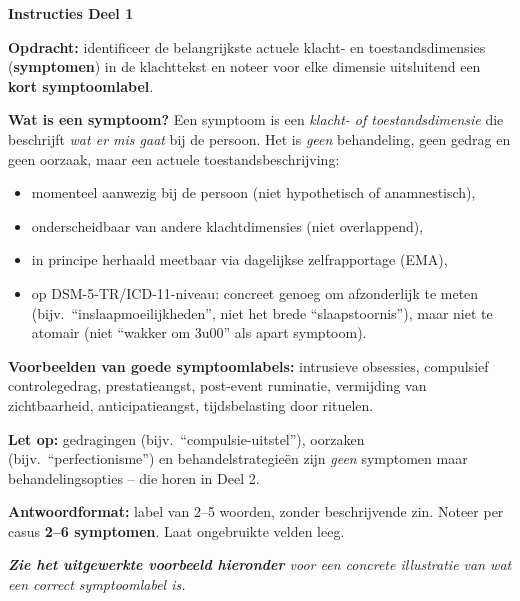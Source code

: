 \documentclass[11pt,a4paper]{article}
\begin{document}
\begin{tcolorbox}[colback=blue!3,colframe=PrimaryBlue,arc=2.5mm,boxrule=0.9pt,
  left=10pt,right=10pt,top=9pt,bottom=9pt]
\textbf{\color{PrimaryBlue}Instructies Deel 1}

\smallskip\small
\textbf{Opdracht:} identificeer de belangrijkste actuele klacht- en toestandsdimensies
(\textbf{symptomen}) in de klachttekst en noteer voor elke dimensie uitsluitend een
\textbf{kort symptoomlabel}.

\textbf{Wat is een symptoom?}
Een symptoom is een \emph{klacht- of toestandsdimensie} die beschrijft \emph{wat er
mis gaat} bij de persoon. Het is \emph{geen} behandeling, geen gedrag en geen oorzaak,
maar een actuele toestandsbeschrijving:
\begin{itemize}[topsep=2pt,itemsep=1pt]
\item momenteel aanwezig bij de persoon (niet hypothetisch of anamnestisch),
\item onderscheidbaar van andere klachtdimensies (niet overlappend),
\item in principe herhaald meetbaar via dagelijkse zelfrapportage (EMA),
\item op DSM-5-TR/ICD-11-niveau: concreet genoeg om afzonderlijk te meten (bijv.\ ``inslaapmoeilijkheden'', niet het brede ``slaapstoornis''), maar niet te atomair (niet ``wakker om 3u00'' als apart symptoom).
\end{itemize}

\textbf{Voorbeelden van goede symptoomlabels:}
intrusieve obsessies, compulsief controlegedrag, prestatieangst, post-event ruminatie,
vermijding van zichtbaarheid, anticipatieangst, tijdsbelasting door rituelen.

\textbf{Let op:} gedragingen (bijv.\ ``compulsie-uitstel''), oorzaken (bijv.\ ``perfectionisme'')
en behandelstrategieën zijn \emph{geen} symptomen maar behandelingsopties -- die horen in Deel 2.

\textbf{Antwoordformat:} label van 2--5 woorden, zonder beschrijvende zin.
Noteer per casus \textbf{2--6 symptomen}. Laat ongebruikte velden leeg.

\medskip
\textit{\textbf{Zie het uitgewerkte voorbeeld hieronder} voor een concrete illustratie van wat een correct symptoomlabel is.}
\end{tcolorbox}

\vspace{0.5em}
\nopagebreak[4]
\end{document}

